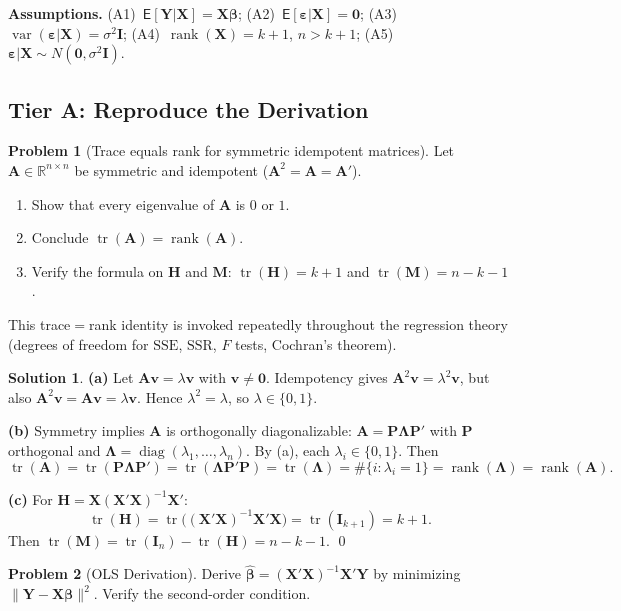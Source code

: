 \documentclass[12pt,a4paper]{article}
\theoremstyle{definition}
\newtheorem{exercise}{Problem}
\newtheorem*{solution*}{Solution}
\newcommand\expc{\mathsf{E}}
\DeclareMathOperator\var{var}
\DeclareMathOperator\tr{tr}
\DeclareMathOperator\rank{rank}
\DeclareMathOperator\diag{diag}
\newcommand{\SSR}{\mathrm{SSR}}
\newcommand{\SSE}{\mathrm{SSE}}
\newcommand{\bX}{\mathbf{X}}
\newcommand{\bY}{\mathbf{Y}}
\def\bb{\boldsymbol{\beta}}
\newcommand{\be}{\boldsymbol{\varepsilon}}
\newcommand{\bI}{\mathbf{I}}
\newcommand{\bH}{\mathbf{H}}
\newcommand{\bM}{\mathbf{M}}
\newcommand{\bzero}{\mathbf{0}}
\newcommand{\bA}{\mathbf{A}}
\newcommand{\bP}{\mathbf{P}}
\newcommand{\bv}{\mathbf{v}}
\newcommand{\Real}{\mathbb{R}}
\begin{document}
\noindent\textbf{Assumptions.}\; (A1)~$\expc[\bY|\bX]=\bX\bb$; (A2)~$\expc[\be|\bX]=\bzero$; (A3)~$\var(\be|\bX)=\sigma^2\bI$; (A4)~$\rank(\bX)=k{+}1$, $n>k{+}1$; (A5)~$\be|\bX \sim N(\bzero,\sigma^2\bI)$.

\subsection*{Tier A: Reproduce the Derivation}

\begin{exercise}[Trace equals rank for symmetric idempotent matrices]\label{prob:A1}
Let $\bA \in \Real^{n\times n}$ be symmetric and idempotent ($\bA^2 = \bA = \bA'$).
\begin{enumerate}[label=(\alph*),nosep]
\item Show that every eigenvalue of $\bA$ is $0$ or $1$.
\item Conclude $\tr(\bA) = \rank(\bA)$.
\item Verify the formula on $\bH$ and $\bM$: $\tr(\bH) = k+1$ and $\tr(\bM) = n-k-1$.
\end{enumerate}
This trace$=$rank identity is invoked repeatedly throughout the regression theory (degrees of freedom for $\SSE$, $\SSR$, $F$ tests, Cochran's theorem).
\end{exercise}

\begin{solution*}
\textbf{(a)} Let $\bA\bv = \lambda\bv$ with $\bv \neq \bzero$. Idempotency gives $\bA^2\bv = \lambda^2\bv$, but also $\bA^2\bv = \bA\bv = \lambda\bv$. Hence $\lambda^2 = \lambda$, so $\lambda \in \{0,1\}$.

\textbf{(b)} Symmetry implies $\bA$ is orthogonally diagonalizable: $\bA = \bP\boldsymbol\Lambda\bP'$ with $\bP$ orthogonal and $\boldsymbol\Lambda = \diag(\lambda_1,\ldots,\lambda_n)$. By (a), each $\lambda_i \in \{0,1\}$. Then
\[
\tr(\bA) = \tr(\bP\boldsymbol\Lambda\bP') = \tr(\boldsymbol\Lambda\bP'\bP) = \tr(\boldsymbol\Lambda) = \#\{i : \lambda_i = 1\} = \rank(\boldsymbol\Lambda) = \rank(\bA).
\]

\textbf{(c)} For $\bH = \bX(\bX'\bX)^{-1}\bX'$:
\[
\tr(\bH) = \tr\bigl((\bX'\bX)^{-1}\bX'\bX\bigr) = \tr(\bI_{k+1}) = k+1.
\]
Then $\tr(\bM) = \tr(\bI_n) - \tr(\bH) = n-k-1$. \qed
\end{solution*}

\begin{exercise}[OLS Derivation]\label{prob:A2}
Derive $\hat{\bb} = (\bX'\bX)^{-1}\bX'\bY$ by minimizing $\|\bY - \bX\bb\|^2$. Verify the second-order condition.
\end{exercise}
\end{document}
